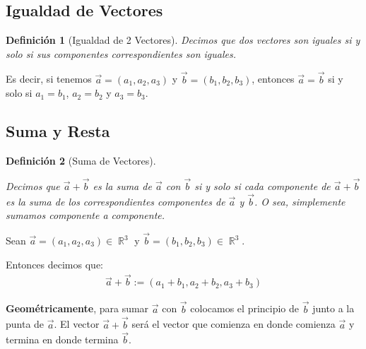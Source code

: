\documentclass[12pt, fleqn]{report}                             %
\newtheorem{Definition}{Definición}[section]                    %
\theoremstyle{break}                                            %
\DeclareMathOperator \Reals        {\mathbb{R}}                 %
\begin{document}
            \subsection{Igualdad de Vectores}

                \begin{Definition}[Igualdad de 2 Vectores]
                    \label{DefIgualdadVectores}
                    Decimos que dos vectores son iguales si y solo si sus componentes
                    correspondientes son iguales.
                \end{Definition}

                Es decir, si tenemos $\vec{a} = (a_1, a_2, a_3)$ y $\vec{b} = (b_1, b_2, b_3)$,
                entonces $\vec{a} = \vec{b}$ si y solo si $a_1 = b_1$, $a_2 = b_2$ y $a_3 = b_3$.

            
            \subsection{Suma y Resta}
            
                \begin{Definition}[Suma de Vectores]
                    \label{DefSumaVectores}

                    Decimos que $\vec{a}+\vec{b}$ es la suma de $\vec{a}$ con $\vec{b}$ si y solo si 
                    cada componente de $\vec{a}+\vec{b}$ es la suma de los correspondientes componentes
                    de $\vec{a}$ y $\vec{b}$.
                    O sea, simplemente sumamos componente a componente.

                \end{Definition}

                Sean $\vec{a} = (a_1, a_2, a_3) \in \Reals^3$ y $\vec{b}=(b_1, b_2, b_3) \in \Reals^3$.

                Entonces decimos que:
                \begin{align}
                    \vec{a} + \vec{b} := (a_1 + b_1, a_2 + b_2, a_3 + b_3)
                \end{align}
            
                \textbf{Geométricamente}, para sumar $\vec{a}$ con $\vec{b}$ colocamos el principio de
                $\vec{b}$ junto a la punta de $\vec{a}$. El vector $\vec{a} + \vec{b}$ será el vector
                que comienza en donde comienza $\vec{a}$ y termina en donde termina $\vec{b}$.
                
\end{document}
